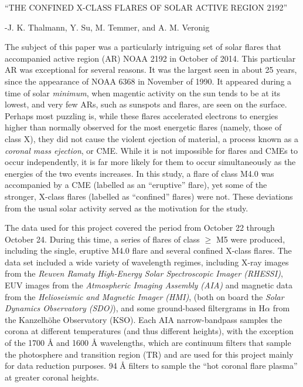 \documentclass[12pt]{article}
\begin{document}
\begin{centering}
    {\large ``THE CONFINED X-CLASS FLARES OF SOLAR ACTIVE REGION 2192''}
\end{centering}
\begin{centering}
    -J. K. Thalmann, Y. Su, M. Temmer, and A. M. Veronig
\end{centering}

The subject of this paper was a particularly intriguing
set of solar flares
that accompanied active region (AR) NOAA 2192 in October of 2014.
This particular AR was exceptional for several reasons.
It was the largest seen in about 25 years,
since the appearance of NOAA 6368 in November of 1990.
It appeared during a time of solar \emph{minimum}, when magentic
activity on the sun tends to be at its lowest, and very few
ARs, such as sunspots and flares, are seen on the surface.
Perhaps most puzzling is,
while these flares accelerated electrons to energies higher than normally
observed for the most energetic flares (namely, those of class X),
they did not cause the violent ejection of material,
a process known as a \emph{coronal mass ejection}, or CME\@.
While it is not impossible for flares and CMEs
to occur independently, it is far more likely for them to occur
simultaneously as the energies of the two events increases.
In this study, a flare of class M4.0 was accompanied by a CME
(labelled as an ``eruptive'' flare),
yet some of the stronger, X-class flares (labelled as
``confined'' flares) were not.
These deviations from the usual solar activity
served as the motivation for the study.

The data used for this project covered the period from October 22
through October 24.
During this time, a series of flares of class $\geq$ M5 were produced,
including the single, eruptive M4.0 flare and several
confined X-class flares.
The data set included a wide variety of wavelength regimes, including
X-ray images from the
\emph{Reuven Ramaty High-Energy Solar Spectroscopic Imager (RHESSI)},
EUV images from the
\emph{Atmospheric Imaging Assembly (AIA)} and
magnetic data from the
\emph{Helioseismic and Magnetic Imager (HMI)}, (both on board the
\emph{Solar Dynamics Observatory (SDO)}), and some ground-based
filtergrams in H$\alpha$ from the Kanzelh\"{o}he Observatory (KSO).
Each AIA narrow-bandpass samples the corona at different temperatures
(and thus different heights), with the exception of the 1700 \AA{}
and 1600 \AA{} wavelengths, which are continuum filters that
sample the photosphere and transition region (TR) and are used for
this project mainly for data reduction purposes.
94 \AA{} filters to sample the ``hot coronal flare plasma''
at greater coronal heights.
\end{document}

